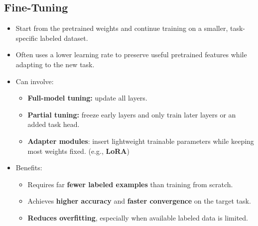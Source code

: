 \subsection*{Fine-Tuning}
\begin{itemize}
      \item Start from the pretrained weights and continue training on a smaller, task-specific labeled dataset.  
      \item Often uses a lower learning rate to preserve useful pretrained features while adapting to the new task.  
      \item Can involve:
        \begin{itemize}
          \item \textbf{Full-model tuning:} update all layers.  
          \item \textbf{Partial tuning:} freeze early layers and only train later layers or an added task head.  
          \item \textbf{Adapter modules}: insert lightweight trainable parameters while keeping most weights fixed. (e.g., \textbf{LoRA})
        \end{itemize}
      \item Benefits:
        \begin{itemize}
          \item Requires far \textbf{fewer labeled examples} than training from scratch.  
          \item Achieves \textbf{higher accuracy} and \textbf{faster convergence} on the target task.  
          \item \textbf{Reduces overfitting}, especially when available labeled data is limited.
        \end{itemize}
\end{itemize}

